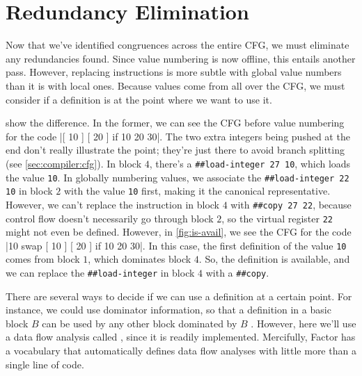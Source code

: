 \section{Redundancy Elimination}\label{sec:vn:avail}

Now that we've identified congruences across the entire \gls{CFG}, we must
eliminate any redundancies found.  Since value numbering is now offline, this
entails another pass.  However, replacing instructions is more subtle with
global value numbers than it is with local ones.  Because values come from all
over the \gls{CFG}, we must consider if a definition is  at the
point where we want to use it.  

 show the difference.  In the former, we can
see the \gls{CFG} before value numbering for the code
%
\factor|[ 10 ] [ 20 ] if 10 20 30|.
%
The two extra integers being pushed at the end don't really illustrate the
point; they're just there to avoid branch splitting (see
\cref{sec:compiler:cfg}).  In block $4$, there's a
%
\Verb|##load-integer 27 10|,
%
which loads the value \Verb|10|.  In globally numbering values, we associate
the
%
\Verb|##load-integer 22 10|
%
in block $2$ with the value \Verb|10| first, making it the canonical
representative.  However, we can't replace the instruction in block $4$ with
%
\Verb|##copy 27 22|,
%
because control flow doesn't necessarily go through block $2$, so the virtual
register \Verb|22| might not even be defined.  However, in \vref{fig:is-avail},
we see the \gls{CFG} for the code
%
\factor|10 swap [ 10 ] [ 20 ] if 10 20 30|.
%
In this case, the first definition of the value \Verb|10| comes from block $1$,
which dominates block $4$.  So, the definition is available, and we can replace
the \Verb|##load-integer| in block $4$ with a \Verb|##copy|.


There are several ways to decide if we can use a definition at a certain point.
For instance, we could use dominator information, so that a definition in a
basic block $B$ can be used by any other block dominated by $B$
\autocite{Simpson}.  However, here we'll use a data flow analysis called
, since it is readily implemented.
Mercifully, Factor has a vocabulary that automatically defines data flow
analyses with little more than a single line of code.

